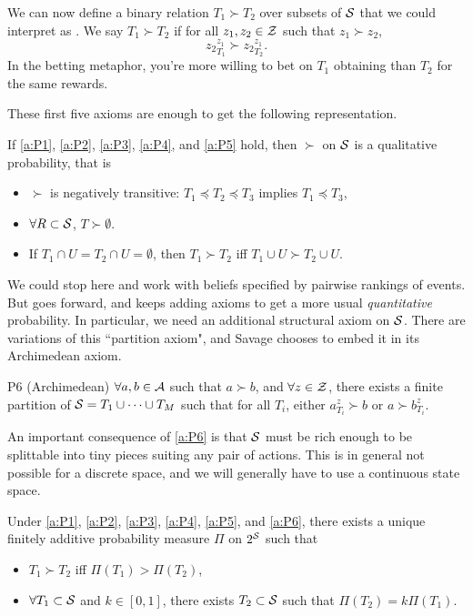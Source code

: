 We can now define a binary relation $T_1\succ T_2$ over subsets of $\mathcal{S}$ that we could interpret as . We say $T_1\succ T_2$ if for all $z_1, z_2\in\mathcal{Z}$ such that $z_1\succ z_2$,
$$
{z_2}_{T_1}^{z_1} \succ {z_2}_{T_2}^{z_1}.
$$
In the betting metaphor, you're more willing to bet on $T_1$ obtaining than $T_2$ for the same 
rewards.

These first five axioms are enough to get the following representation.
\begin{theorem}
If \ref{a:P1}, \ref{a:P2}, \ref{a:P3}, \ref{a:P4}, and \ref{a:P5} hold, then $\succ$ on $\mathcal{S}$ is a qualitative probability, that is
\begin{itemize}
\item $\succ$ is negatively transitive: $T_1\preccurlyeq T_2 \preccurlyeq T_3$ implies $T_1\preccurlyeq T_3$,
\item $\forall R\subset \mathcal{S}$, $T\succ \emptyset$.
\item If $T_1\cap U = T_2\cap U=\emptyset$, then $T_1\succ T_2$ iff $T_1\cup U\succ T_2\cup U$.
\end{itemize}
\end{theorem}

We could stop here and work with beliefs specified by pairwise rankings of events.
 But \cite{Sav54} goes forward, and keeps adding axioms to get a more usual \emph{quantitative} probability. 
 In particular, we need an additional structural axiom on $\mathcal{S}$. 
 There are variations of this ``partition axiom", and Savage chooses to embed it in its Archimedean axiom.

\begin{axiom}{P6 (Archimedean)}\label{a:P6}
$\forall a,b\in\mathcal{A}$ such that $a\succ b$, and $\forall z\in\mathcal{Z}$, there exists a finite partition of $\mathcal{S} = T_1\cup\dots\cup T_M$ such that for all $T_i$, either
$a_{T_i}^z \succ b$ or $a\succ b_{T_i}^z$.
\end{axiom}
An important consequence of \ref{a:P6} is that $\mathcal{S}$ must be rich enough to be splittable into tiny pieces suiting any pair of actions. 
This is in general not possible for a discrete space, and we will generally have to use a continuous state space. 

\begin{theorem}
Under \ref{a:P1}, \ref{a:P2}, \ref{a:P3}, \ref{a:P4}, \ref{a:P5}, and \ref{a:P6}, there exists a unique finitely additive probability measure $\Pi$ on $2^{\mathcal{S}}$ such that
\begin{itemize}
\item $T_1\succ T_2$ iff $\Pi(T_1)>\Pi(T_2)$,
\item $\forall T_1\subset \mathcal{S}$ and $k\in[0,1]$, there exists $T_2\subset \mathcal{S}$ such that
$\Pi(T_2) = k\Pi(T_1)$.
\end{itemize}
\label{t:savageIntermediate}
\end{theorem}

